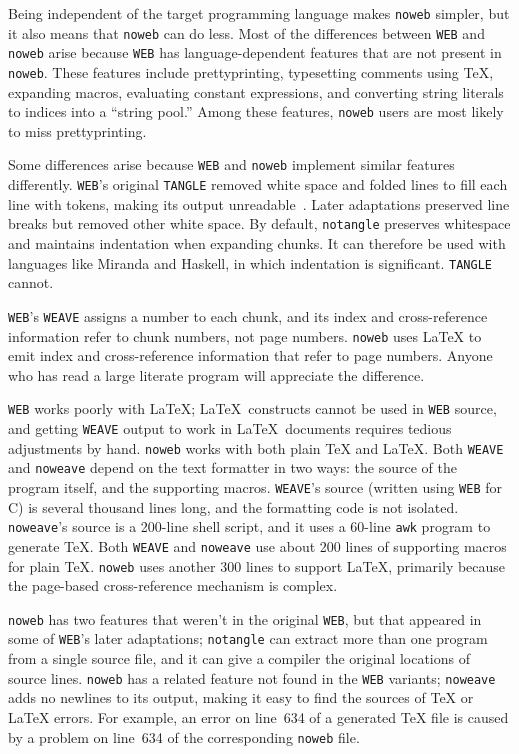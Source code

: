 Being independent of the target programming language makes {\tt noweb}
simpler, but it also means that {\tt noweb} can do less.
Most of the differences between {\tt WEB} and {\tt noweb} arise
because {\tt WEB} has language-dependent features that are not present
in \verb+noweb+.
These features include 
prettyprinting, 
typesetting comments using {\TeX},
expanding macros, 
evaluating constant expressions, 
and 
converting string literals to indices into a ``string pool.''
Among these features, 
\verb+noweb+ users are most likely to miss prettyprinting. 


Some differences arise because {\tt WEB} and \verb+noweb+ implement
similar features differently. 
{\tt WEB}'s  original {\tt TANGLE} removed white space and folded
lines to fill each line with tokens,
making its output unreadable~\cite[Chapter~4, Figure~3]{knuth:literate:book}.
Later adaptations preserved line breaks but removed other white space.
By default, \verb+notangle+ preserves whitespace and maintains
indentation when expanding chunks.
It can therefore be used with
languages like Miranda and
Haskell, in which indentation is significant.
{\tt TANGLE} cannot.

{\tt WEB}'s {\tt WEAVE} assigns a number to each chunk, and its index
and cross-reference
information refer to chunk numbers, not page numbers.
\verb+noweb+ uses {\LaTeX} to emit index and cross-reference information that
refer to page numbers.
Anyone who has read a large literate program will
appreciate the difference.

{\tt WEB} works poorly with \LaTeX; \LaTeX\ constructs cannot
be used in {\tt WEB} source, and getting {\tt WEAVE} output
to work in \LaTeX\ documents requires tedious adjustments by hand.
\verb+noweb+ works with both plain {\TeX} and {\LaTeX}.
Both {\tt WEAVE} and {\tt noweave} depend on the text formatter in two
ways: the source of the program itself, and the supporting macros.
{\tt WEAVE}'s source (written using {\tt WEB} for C) is
several thousand lines long, and the formatting code is not isolated.
{\tt noweave}'s source is a 200-line shell script, and it uses a
60-line {\tt awk} program to generate {\TeX}.
Both 
{\tt WEAVE} and {\tt noweave} use about 200 lines of supporting macros
for plain {\TeX}.
\verb+noweb+ uses another 300 lines to support {\LaTeX}, primarily
because the page-based cross-reference mechanism is complex.

{\tt noweb} has
two features that weren't in the original {\tt WEB}, but that appeared in
some of {\tt WEB}'s later adaptations;
{\tt notangle} can extract more than one program from
a single source file, and it can give a compiler the original locations
of source lines.
{\tt noweb} has a related feature not found in the {\tt WEB} variants;
{\tt noweave} adds no newlines to its output, making it easy to find
the sources of {\TeX} or {\LaTeX} errors.
For example, an error on line~634 of a generated
{\TeX} file is caused by a problem on line~634 of the
corresponding {\tt noweb} file.


